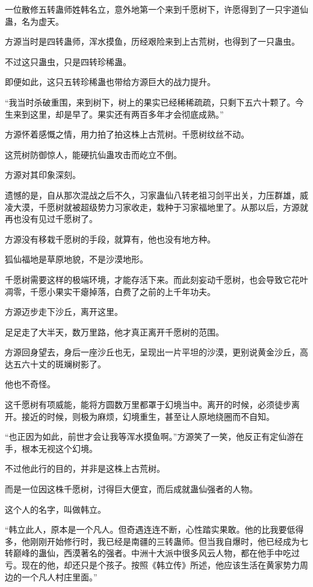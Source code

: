 \begin{this_body}
一位散修五转蛊师姓韩名立，意外地第一个来到千愿树下，许愿得到了一只宇道仙蛊，名为虚天。

方源当时是四转蛊师，浑水摸鱼，历经艰险来到上古荒树，也得到了一只蛊虫。

不过这只蛊虫，只是四转珍稀蛊。

即便如此，这只五转珍稀蛊也带给方源巨大的战力提升。

“我当时杀破重围，来到树下，树上的果实已经稀稀疏疏，只剩下五六十颗了。今生来到这里，却是早了。果实还有两百多年才会彻底成熟。”

方源怀着感慨之情，用力拍了拍这株上古荒树。千愿树纹丝不动。

这荒树防御惊人，能硬抗仙蛊攻击而屹立不倒。

方源对其印象深刻。

遗憾的是，自从那次混战之后不久，习家蛊仙八转老祖习剑平出关，力压群雄，威凌大漠，千愿树就被超级势力习家收走，栽种于习家福地里了。从那以后，方源就再也没有见过千愿树了。

方源没有移栽千愿树的手段，就算有，他也没有地方种。

狐仙福地是草原地貌，不是沙漠地形。

千愿树需要这样的极端环境，才能存活下来。而此刻妄动千愿树，也会导致它花叶凋零，千愿小果实干瘪掉落，白费了之前的上千年功夫。

方源迈步走下沙丘，离开这里。

足足走了大半天，数万里路，他才真正离开千愿树的范围。

方源回身望去，身后一座沙丘也无，呈现出一片平坦的沙漠，更别说黄金沙丘，高达五六十丈的斑斓树影了。

他也不奇怪。

这千愿树有项威能，能将方圆数万里都罩于幻境当中。离开的时候，必须徒步离开。接近的时候，则极为麻烦，幻境重生，甚至让人原地绕圈而不自知。

“也正因为如此，前世才会让我等浑水摸鱼啊。”方源笑了一笑，他反正有定仙游在手，根本无视这个幻境。

不过他此行的目的，并非是这株上古荒树。

而是一位因这株千愿树，讨得巨大便宜，而后成就蛊仙强者的人物。

这个人的名字，叫做韩立。

“韩立此人，原本是一个凡人。但奇遇连连不断，心性踏实果敢。他的比我要低得多，他刚刚开始修行时，我已经是南疆的三转蛊师。但当我自爆时，他已经成为七转巅峰的蛊仙，西漠著名的强者。中洲十大派中很多风云人物，都在他手中吃过亏。现在的他，却还只是个孩子。按照《韩立传》所述，他应该生活在黄家势力周边的一个凡人村庄里面。”


\end{this_body}
